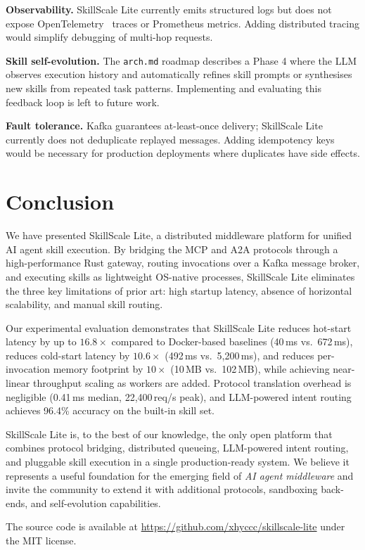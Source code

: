\documentclass[sigconf,nonacm]{acmart}
\begin{document}
\textbf{Observability.} SkillScale Lite currently emits structured logs but does not expose OpenTelemetry~\cite{opentelemetry2021} traces or Prometheus metrics. Adding distributed tracing would simplify debugging of multi-hop requests.

\textbf{Skill self-evolution.} The \texttt{arch.md} roadmap describes a Phase 4 where the LLM observes execution history and automatically refines skill prompts or synthesises new skills from repeated task patterns. Implementing and evaluating this feedback loop is left to future work.

\textbf{Fault tolerance.} Kafka guarantees at-least-once delivery; SkillScale Lite currently does not deduplicate replayed messages. Adding idempotency keys would be necessary for production deployments where duplicates have side effects.

\section{Conclusion}
\label{sec:conclusion}

We have presented SkillScale Lite, a distributed middleware platform for unified AI agent skill execution. By bridging the MCP and A2A protocols through a high-performance Rust gateway, routing invocations over a Kafka message broker, and executing skills as lightweight OS-native processes, SkillScale Lite eliminates the three key limitations of prior art: high startup latency, absence of horizontal scalability, and manual skill routing.

Our experimental evaluation demonstrates that SkillScale Lite reduces hot-start latency by up to $16.8\times$ compared to Docker-based baselines (40\,ms vs.\ 672\,ms), reduces cold-start latency by $10.6\times$ (492\,ms vs.\ 5,200\,ms), and reduces per-invocation memory footprint by $10\times$ (10\,MB vs.\ 102\,MB), while achieving near-linear throughput scaling as workers are added. Protocol translation overhead is negligible (0.41\,ms median, 22,400\,req/s peak), and LLM-powered intent routing achieves 96.4\% accuracy on the built-in skill set.

SkillScale Lite is, to the best of our knowledge, the only open platform that combines protocol bridging, distributed queueing, LLM-powered intent routing, and pluggable skill execution in a single production-ready system. We believe it represents a useful foundation for the emerging field of \emph{AI agent middleware} and invite the community to extend it with additional protocols, sandboxing back-ends, and self-evolution capabilities.

The source code is available at \url{https://github.com/xhyccc/skillscale-lite} under the MIT license.

\balance


\end{document}

